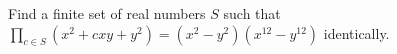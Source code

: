 Find a finite set of real numbers $ S $ such that $\prod_{c\in S}(x^2+cxy+y^2)=(x^2-y^2)(x^{12}-y^{12})$ identically.
